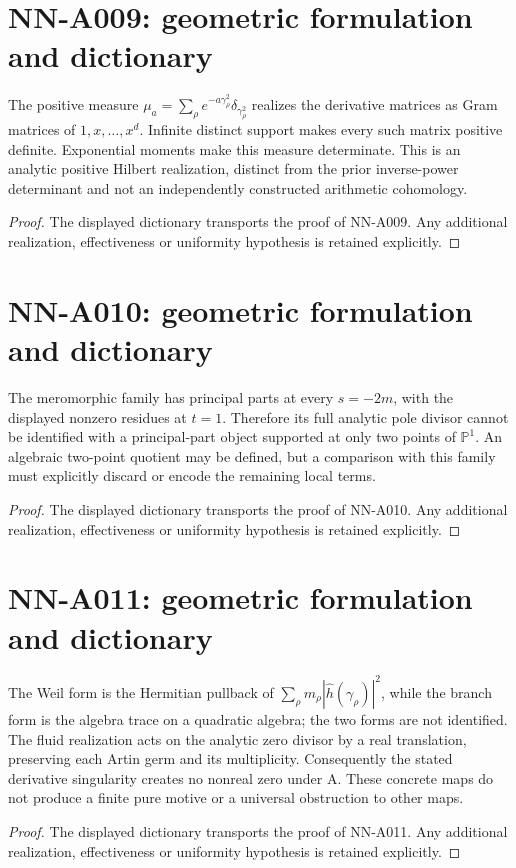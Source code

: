 \section{NN-A009: geometric formulation and dictionary}
\begin{geometricstatement}[NN-A009]
The positive measure $\mu_a=\sum_\rho e^{-a\gamma_\rho^2}\delta_{\gamma_\rho^2}$ realizes the derivative matrices as Gram matrices of $1,x,\ldots,x^d$. Infinite distinct support makes every such matrix positive definite. Exponential moments make this measure determinate. This is an analytic positive Hilbert realization, distinct from the prior inverse-power determinant and not an independently constructed arithmetic cohomology.
\end{geometricstatement}
\begin{proof} The displayed dictionary transports the proof of NN-A009. Any additional realization, effectiveness or uniformity hypothesis is retained explicitly.\end{proof}


\section{NN-A010: geometric formulation and dictionary}
\begin{geometricstatement}[NN-A010]
The meromorphic family has principal parts at every $s=-2m$, with the displayed nonzero residues at $t=1$. Therefore its full analytic pole divisor cannot be identified with a principal-part object supported at only two points of $\mathbb P^1$. An algebraic two-point quotient may be defined, but a comparison with this family must explicitly discard or encode the remaining local terms.
\end{geometricstatement}
\begin{proof} The displayed dictionary transports the proof of NN-A010. Any additional realization, effectiveness or uniformity hypothesis is retained explicitly.\end{proof}


\section{NN-A011: geometric formulation and dictionary}
\begin{geometricstatement}[NN-A011]
The Weil form is the Hermitian pullback of $\sum_\rho m_\rho|\widehat h(\gamma_\rho)|^2$, while the branch form is the algebra trace on a quadratic algebra; the two forms are not identified. The fluid realization acts on the analytic zero divisor by a real translation, preserving each Artin germ and its multiplicity. Consequently the stated derivative singularity creates no nonreal zero under A. These concrete maps do not produce a finite pure motive or a universal obstruction to other maps.
\end{geometricstatement}
\begin{proof} The displayed dictionary transports the proof of NN-A011. Any additional realization, effectiveness or uniformity hypothesis is retained explicitly.\end{proof}


